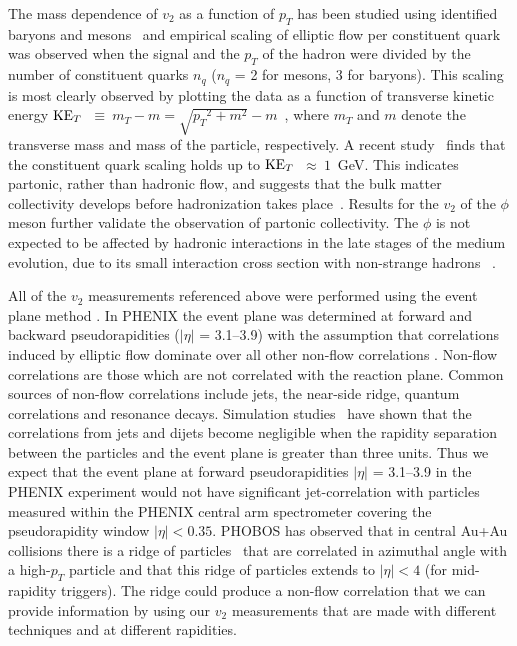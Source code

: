 \documentclass[aps,prc,superscriptaddress,showpacs,floatfix,twocolumn]{revtex4}
\newcommand \pt{\mbox{$p_T$}\xspace}
\newcommand \KET{\mbox{${\rm KE}_T$}\xspace}
\begin{document}
The mass dependence of $v_2$ as a function of \pt has been 
studied using identified baryons and 
mesons~\cite{Adler:2003kt,Adams:2003am} and empirical scaling of 
elliptic flow per constituent quark was observed when the signal 
and the \pt of the hadron were divided by the number of 
constituent quarks $n_q$ ($n_q$ = 2 for mesons, 3 for baryons). 
This scaling is most clearly observed by plotting the data as a 
function of transverse kinetic energy 
\KET~$\equiv~m_T-m = \sqrt{\pt^2 + m^2}-m$~\cite{Adare:2006ti}, 
where $m_T$ and $m$ denote the transverse mass and mass of the 
particle, respectively. A recent study~\cite{Huang:2008vd} finds 
that the constituent quark scaling holds up to 
\KET~$\approx~1$~GeV. This indicates partonic, rather than 
hadronic flow, and suggests that the bulk matter collectivity 
develops before hadronization takes 
place~\cite{PhysRevLett.91.092301,PhysRevC.68.044902,PhysRevC.68.034904}. 
Results for the $v_2$ of the $\phi$ meson further validate the 
observation of partonic collectivity. The $\phi$ is not expected 
to be affected by hadronic interactions in the late stages of 
the medium evolution, due to its small interaction cross section 
with non-strange hadrons ~\cite{Shor:1984ui}.

All of the $v_2$ measurements referenced above were performed 
using the event plane method \cite{Poskanzer:1998yz}. In PHENIX 
the event plane was determined at forward and backward 
pseudorapidities ($|\eta|$ = 3.1--3.9) with the assumption that 
correlations induced by elliptic flow dominate over all other 
non-flow correlations \cite{Adler:2003kt}. Non-flow correlations 
are those which are not correlated with the reaction plane. 
Common sources of non-flow correlations include jets, the 
near-side ridge, quantum correlations and resonance decays. 
Simulation studies~\cite{Adler:2003kt,Jia:2006sb} have shown 
that the correlations from jets and dijets become negligible 
when the rapidity separation between the particles and the event 
plane is greater than three units. Thus we expect that the event 
plane at forward pseudorapidities $|\eta|$ = 3.1--3.9 in the 
PHENIX experiment would not have significant jet-correlation 
with particles measured within the PHENIX central arm 
spectrometer covering the pseudorapidity window $|\eta| < 0.35$. 
PHOBOS has observed that in central Au+Au collisions there is a 
ridge of particles~\cite{Alver:2009id} that are correlated in 
azimuthal angle with a high-$\pt$ particle and that this ridge 
of particles extends to $|\eta| < 4$ (for mid-rapidity 
triggers). The ridge could produce a non-flow correlation that 
we can provide information by using our $v_2$ measurements that 
are made with different techniques and at different rapidities.
\end{document}
